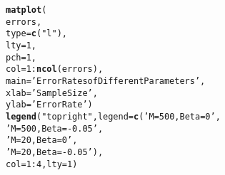 \documentclass[11pt,english]{article}\usepackage[]{graphicx}\usepackage[]{color}
\makeatletter
\newcommand{\hlnum}[1]{\textcolor[rgb]{0.686,0.059,0.569}{#1}}%
\newcommand{\hlstr}[1]{\textcolor[rgb]{0.192,0.494,0.8}{#1}}%
\newcommand{\hlopt}[1]{\textcolor[rgb]{0,0,0}{#1}}%
\newcommand{\hlstd}[1]{\textcolor[rgb]{0.345,0.345,0.345}{#1}}%
\newcommand{\hlkwc}[1]{\textcolor[rgb]{0.333,0.667,0.333}{#1}}%
\newcommand{\hlkwd}[1]{\textcolor[rgb]{0.737,0.353,0.396}{\textbf{#1}}}%
\newenvironment{kframe}{%
 \def\at@end@of@kframe{}%
 \ifinner\ifhmode%
  \def\at@end@of@kframe{\end{minipage}}%
  \begin{minipage}{\columnwidth}%
 \fi\fi%
 \def\FrameCommand##1{\hskip\@totalleftmargin \hskip-\fboxsep
 \colorbox{shadecolor}{##1}\hskip-\fboxsep
     \hskip-\linewidth \hskip-\@totalleftmargin \hskip\columnwidth}%
 \MakeFramed {\advance\hsize-\width
   \@totalleftmargin\z@ \linewidth\hsize
   \@setminipage}}%
 {\par\unskip\endMakeFramed%
 \at@end@of@kframe}
\newenvironment{knitrout}{}{} %
\makeatother
\begin{document}
\begin{knitrout}
\begin{kframe}
\begin{alltt}
\hlkwd{matplot}\hlstd{(}
    \hlstd{errors,}
    \hlkwc{type} \hlstd{=} \hlkwd{c}\hlstd{(}\hlstr{"l"}\hlstd{),}
    \hlkwc{lty} \hlstd{=} \hlnum{1}\hlstd{,}
    \hlkwc{pch} \hlstd{=} \hlnum{1}\hlstd{,}
    \hlkwc{col} \hlstd{=} \hlnum{1}\hlopt{:}\hlkwd{ncol}\hlstd{(errors),}
    \hlkwc{main} \hlstd{=} \hlstr{'Error Rates of Different Parameters'}\hlstd{,}
    \hlkwc{xlab} \hlstd{=} \hlstr{'Sample Size'}\hlstd{,}
    \hlkwc{ylab} \hlstd{=} \hlstr{'Error Rate'}\hlstd{)}
\hlkwd{legend}\hlstd{(}\hlstr{"topright"}\hlstd{,} \hlkwc{legend} \hlstd{=} \hlkwd{c}\hlstd{(}\hlstr{'M = 500, Beta = 0'}\hlstd{,}
                              \hlstr{'M = 500, Beta = -0.05'}\hlstd{,}
                              \hlstr{'M = 20,  Beta = 0'}\hlstd{,}
                              \hlstr{'M = 20,  Beta = -0.05'}\hlstd{),}
       \hlkwc{col}\hlstd{=}\hlnum{1}\hlopt{:}\hlnum{4}\hlstd{,} \hlkwc{lty} \hlstd{=} \hlnum{1}\hlstd{)}
\end{alltt}
\end{kframe}
\end{knitrout}
\end{document}
